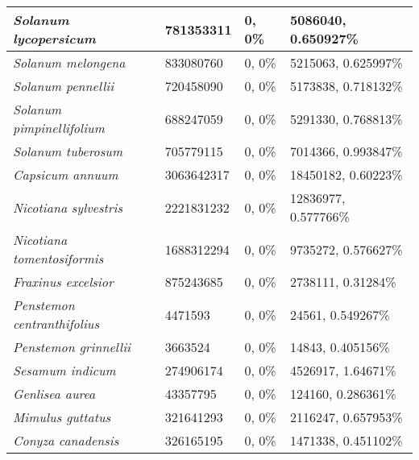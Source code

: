 {\begin{longtable}{| L{4cm} | L{2.7cm}  | L{3.7cm} | L{3.7cm} |}
\textit{Solanum lycopersicum} & 781353311 & 0, 0\% & 5086040, 0.650927\% \\ \hline
\textit{Solanum melongena} & 833080760 & 0, 0\% & 5215063, 0.625997\% \\ \hline
\textit{Solanum pennellii} & 720458090 & 0, 0\% & 5173838, 0.718132\% \\ \hline
\textit{Solanum pimpinellifolium} & 688247059 & 0, 0\% & 5291330, 0.768813\% \\ \hline
\textit{Solanum tuberosum} & 705779115 & 0, 0\% & 7014366, 0.993847\% \\ \hline
\textit{Capsicum annuum} & 3063642317 & 0, 0\% & 18450182, 0.60223\% \\ \hline
\textit{Nicotiana sylvestris} & 2221831232 & 0, 0\% & 12836977, 0.577766\% \\ \hline
\textit{Nicotiana tomentosiformis} & 1688312294 & 0, 0\% & 9735272, 0.576627\% \\ \hline
\textit{Fraxinus excelsior} & 875243685 & 0, 0\% & 2738111, 0.31284\% \\ \hline
\textit{Penstemon centranthifolius} & 4471593 & 0, 0\% & 24561, 0.549267\% \\ \hline
\textit{Penstemon grinnellii} & 3663524 & 0, 0\% & 14843, 0.405156\% \\ \hline
\textit{Sesamum indicum} & 274906174 & 0, 0\% & 4526917, 1.64671\% \\ \hline
\textit{Genlisea aurea} & 43357795 & 0, 0\% & 124160, 0.286361\% \\ \hline
\textit{Mimulus guttatus} & 321641293 & 0, 0\% & 2116247, 0.657953\% \\ \hline
\textit{Conyza canadensis} & 326165195 & 0, 0\% & 1471338, 0.451102\% \\ \hline

\end{longtable}}
\clearpage
